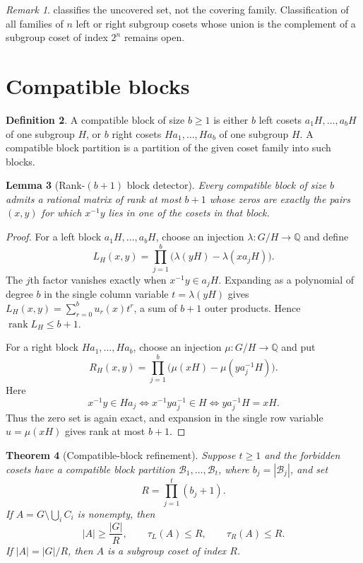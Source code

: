 \documentclass[11pt,a4paper]{amsart}
\newtheorem{theorem}{Theorem}[section]
\newtheorem{lemma}[theorem]{Lemma}
\theoremstyle{definition}
\newtheorem{definition}[theorem]{Definition}
\theoremstyle{remark}
\newtheorem{remark}[theorem]{Remark}
\newcommand{\rank}{\operatorname{rank}}
\newcommand{\Q}{\mathbb{Q}}
\begin{document}
\begin{remark}\label{rem:family-open}
 classifies the uncovered set, not the covering family.
Classification of all families of $n$ left or right subgroup cosets whose union
is the complement of a subgroup coset of index $2^n$ remains open.
\end{remark}

\section{Compatible blocks}

\begin{definition}\label{def:block}
A compatible block of size $b\ge1$ is either $b$ left cosets
$a_1H,\ldots,a_bH$ of one subgroup $H$, or $b$ right cosets
$Ha_1,\ldots,Ha_b$ of one subgroup $H$.  A compatible block partition is a
partition of the given coset family into such blocks.
\end{definition}

\begin{lemma}[Rank-$(b+1)$ block detector]\label{lem:block}
Every compatible block of size $b$ admits a rational matrix of rank at most
$b+1$ whose zeros are exactly the pairs $(x,y)$ for which $x^{-1}y$ lies in
one of the cosets in that block.
\end{lemma}

\begin{proof}
For a left block $a_1H,\ldots,a_bH$, choose an injection
$\lambda:G/H\to\Q$ and define
\[
  L_H(x,y)=\prod_{j=1}^b
  \bigl(\lambda(yH)-\lambda(xa_jH)\bigr).
\]
The $j$th factor vanishes exactly when $x^{-1}y\in a_jH$.  Expanding as a
polynomial of degree $b$ in the single column variable $t=\lambda(yH)$ gives
$L_H(x,y)=\sum_{r=0}^b u_r(x)t^r$, a sum of $b+1$ outer products.  Hence
$\rank L_H\le b+1$.

For a right block $Ha_1,\ldots,Ha_b$, choose an injection $\mu:G/H\to\Q$ and
put
\[
  R_H(x,y)=\prod_{j=1}^b
  \bigl(\mu(xH)-\mu(ya_j^{-1}H)\bigr).
\]
Here
\[
  x^{-1}y\in Ha_j
  \Longleftrightarrow x^{-1}ya_j^{-1}\in H
  \Longleftrightarrow ya_j^{-1}H=xH.
\]
Thus the zero set is again exact, and expansion in the single row variable
$u=\mu(xH)$ gives rank at most $b+1$.
\end{proof}

\begin{theorem}[Compatible-block refinement]\label{thm:grouped}
Suppose $t\ge1$ and the forbidden cosets have a compatible block partition
$\mathcal B_1,\ldots,\mathcal B_t$, where $b_j=|\mathcal B_j|$, and set
\[
  R=\prod_{j=1}^t(b_j+1).
\]
If $A=G\setminus\bigcup_iC_i$ is nonempty, then
\[
  |A|\ge\frac{|G|}{R},\qquad
  \tau_L(A)\le R,\qquad \tau_R(A)\le R.
\]
If $|A|=|G|/R$, then $A$ is a subgroup coset of index $R$.
\end{theorem}
\end{document}

